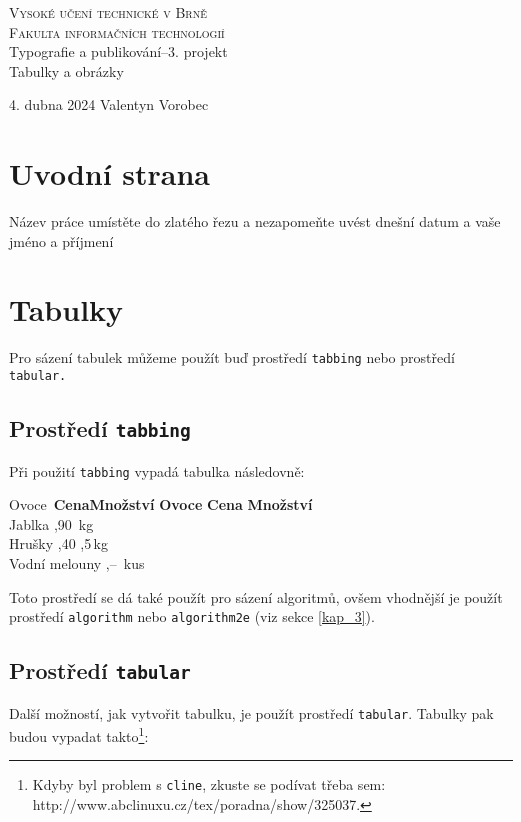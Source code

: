 \documentclass[a4paper,11pt]{article}
\begin{document}
\begin{titlepage}
    \begin{center}
        \textsc{\Huge{Vysoké učení technické v Brně}\\[0.5em]
        \huge{Fakulta informačních technologií}}\\
        \LARGE
        Typografie a publikování--3. projekt\\
        \Huge
        Tabulky a obrázky\\
    \end{center}
    {\LARGE 4. dubna 2024 \hfill
    Valentyn Vorobec}
\end{titlepage}

\section{Uvodní strana}
Název práce umístěte do zlatého řezu a nezapomeňte uvést dnešní datum a vaše jméno a příjmení

\section{Tabulky}
Pro sázení tabulek můžeme použít buď prostředí \texttt{tabbing} nebo prostředí \texttt{tabular.}

\subsection{Prostředí \texttt{tabbing}}
Při použití \texttt{tabbing} vypadá tabulka následovně:

\begin{tabbing}
    Ovoce\qquad\qquad\ \= \textbf{Cena}\quad \= \textbf{Množství} \kill
    \textbf{Ovoce} \> \textbf{Cena} \> \textbf{Množství} \\
    Jablka ,90 \,kg \\
    Hrušky ,40 ,5\,kg \\
    Vodní melouny ,-- \,kus \\
\end{tabbing}

\noindent
Toto prostředí se dá také použít pro sázení algoritmů, ovšem vhodnější je použít prostředí \texttt{algorithm} nebo \texttt{algorithm2e} (viz sekce \ref{kap_3}).

\subsection{Prostředí \texttt{tabular}}
Další možností, jak vytvořit tabulku, je použít prostředí \texttt{tabular}. Tabulky pak budou vypadat takto\footnote{Kdyby byl problem s \texttt{cline}, zkuste se podívat třeba sem: http://www.abclinuxu.cz/tex/poradna/show/325037.}:
\end{document}
